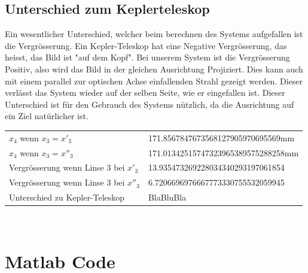 \documentclass[11pt,twoside,a4paper]{article}
\begin{document}
	\subsection{Unterschied zum Keplerteleskop}
	Ein wesentlicher Unterschied, welcher beim berechnen des Systems aufgefallen ist die Vergrösserung. Ein Kepler-Teleskop hat eine Negative Vergrösserung, das heisst, das Bild ist "auf dem Kopf". Bei unserem System ist die Vergrösserung Positiv, also wird das Bild in der gleichen Ausrichtung Projiziert. Dies kann auch mit einem parallel zur optischen Achse einfallenden Strahl gezeigt werden. Dieser verlässt das System wieder auf der selben Seite, wie er eingefallen ist. Dieser Unterschied ist für den Gebrauch des Systems nützlich, da die Ausrichtung auf ein Ziel natürlicher ist.
	\begin{table}
		\centering
		\begin{tabular}{ll}
			\(x_{4}\) wenn \(x_{3} = x'_{3}\) & 171.8567847673568127905970695569mm \\
			\(x_{4}\) wenn \(x_{3} = x''_{3}\) & 171.01342515747323965389575288258mm \\
			Vergrösserung wenn Linse 3 bei \(x'_{3}\) & 13.935473269228034340293197061854 \\
			Vergrösserung wenn Linse 3 bei \(x''_{3}\) & 6.7206696976667773330755532059945 \\
			Unterschied zu Kepler-Teleskop & BlaBluBla \\
		\end{tabular}
	\end{table} \\



\section*{Matlab Code}


\end{document}
